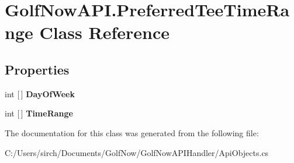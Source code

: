 \hypertarget{class_golf_now_a_p_i_1_1_preferred_tee_time_range}{}\section{Golf\+Now\+A\+P\+I.\+Preferred\+Tee\+Time\+Range Class Reference}
\label{class_golf_now_a_p_i_1_1_preferred_tee_time_range}
\subsection*{Properties}
\begin{DoxyCompactItemize}
\item 
\mbox{\label{class_golf_now_a_p_i_1_1_preferred_tee_time_range_aa665bf5a3f4ccb2eb5eb0a3c0219e0c2}} 
int \mbox{[}$\,$\mbox{]} {\bfseries Day\+Of\+Week}
\item 
\mbox{\label{class_golf_now_a_p_i_1_1_preferred_tee_time_range_a040dedbf99303e72de741d22732a0866}} 
int \mbox{[}$\,$\mbox{]} {\bfseries Time\+Range}
\end{DoxyCompactItemize}


The documentation for this class was generated from the following file\+:\begin{DoxyCompactItemize}
\item 
C\+:/\+Users/sirch/\+Documents/\+Golf\+Now/\+Golf\+Now\+A\+P\+I\+Handler/Api\+Objects.\+cs\end{DoxyCompactItemize}
